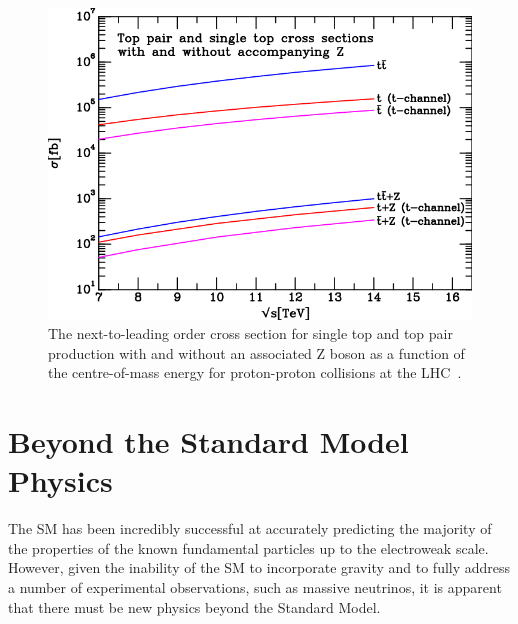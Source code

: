 \begin{figure}[htbp]
\centering
\includegraphics[width=\textwidth]{figs/top-physics/TplusZtot.png}
\caption{The next-to-leading order cross section for single top and top pair production with and without an associated Z boson as a function of the centre-of-mass energy for proton-proton collisions at the LHC~\cite{Campbell:2013yla}.
}
\label{fig:topZcrossSections}
\end{figure}



%   

\section{Beyond the Standard Model Physics}\label{sec:bsm}
The SM has been incredibly successful at accurately predicting the majority of the properties of the known fundamental particles up to the electroweak scale.
However, given the inability of the SM to incorporate gravity and to fully address a number of experimental observations, such as massive neutrinos, it is apparent that there must be new physics beyond the Standard Model.

